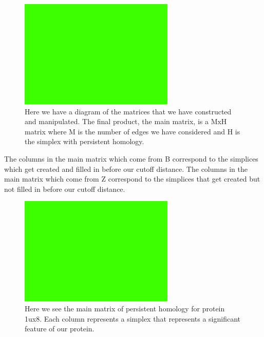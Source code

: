 \documentclass[12pt, a4paper, twocolumn, fullpage]{article}
\theoremstyle{plain}
\theoremstyle{definition}
\theoremstyle{remark}
\begin{document}
\begin{figure}[t]
    \includegraphics[width=\linewidth]{img/blank.png}
    \caption{Here we have a diagram of the matrices that we have constructed and manipulated. The final product, the main matrix, is a MxH matrix where M is the number of edges we have considered and H is the simplex with persistent homology.}
    \label{MatricesOfComputeHom}
\end{figure}

The columns in the main matrix which come from B correspond to the simplices which get created and filled in before our cutoff distance. The columns in the main matrix which come from Z correspond to the simplices that get created but not filled in before our cutoff distance.

\begin{figure}[t]
    \includegraphics[width=\linewidth]{img/blank.png}
    \caption{Here we see the main matrix of persistent homology for protein 1ux8. Each column represents a simplex that represents a significant feature of our protein.}
    \label{1ux8MainMatrix}
\end{figure}
\end{document}
